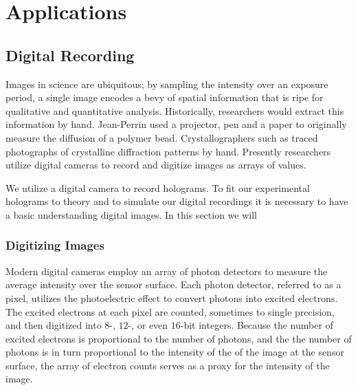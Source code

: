 \section{Applications}




\subsection{Digital Recording}
\label{ch:hvm:sec:hvm:ssec:digitalrec}


Images in science are ubiquitous; by sampling the intensity over an exposure
period, a single image encodes a bevy of spatial information that is ripe
for qualitative and quantitative analysis. Historically, researchers would
extract this information by hand. Jean-Perrin used a projector, pen and a paper to originally
measure the diffusion of a polymer bead. Crystallographers such as %
traced photographs of crystalline diffraction patterns by hand. Presently researchers utilize
digital cameras to record and digitize images as arrays of values. 

We utilize a digital camera to record holograms. To fit our experimental holograms to
theory and to simulate our digital recordings it is necessary to have a basic
understanding digital images. In this section we will 

\subsubsection{Digitizing Images}
\label{ch:hvm:sec:hvm:ssec:digitalrec:sssec:digitizing}

Modern digital cameras employ an array of photon detectors to measure the
average intensity over the sensor surface. Each photon detector, referred to as a pixel,
utilizes the photoelectric effect to convert photons into excited electrons.
The excited electrons at each pixel are counted, sometimes to single precision, and
then digitized into $8$-, $12$-, or even $16$-bit integers. Because the number of
excited electrons is proportional to the number of photons, and the the number of
photons is in turn proportional to the intensity of the of the image at the
sensor surface, the array of electron counts serves as a proxy for the intensity
of the image.

